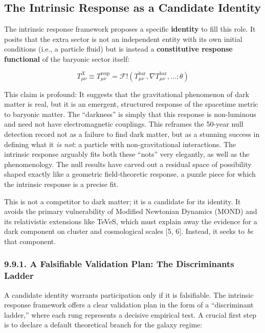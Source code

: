 \documentclass[11pt]{article}
\begin{document}
\subsection{The Intrinsic Response as a Candidate Identity}\label{the-intrinsic-response-as-a-candidate-identity}

The intrinsic response framework proposes a specific \textbf{identity} to fill this role. It posits that the extra sector is not an independent entity with its own initial conditions (i.e., a particle fluid) but is instead a \textbf{constitutive response functional} of the baryonic sector itself:

\[T_{\mu\nu}^{X} \equiv T_{\mu\nu}^{\text{resp}}\mathcal{= F}\text{!}\left( T_{\mu\nu}^{\text{bar}},\nabla T_{\mu\nu}^{\text{bar}},\ldots;\theta \right)\]

This claim is profound: It suggests that the gravitational phenomenon of dark matter is real, but it is an emergent, structured response of the spacetime metric to baryonic matter. The ``darkness'' is simply that this response is non-luminous and need not have electromagnetic couplings. This reframes the 50-year null detection record not as a failure to find dark matter, but as a stunning success in defining what it \emph{is not}: a particle with non-gravitational interactions. The intrinsic response arguably fits both these ``nots'' very elegantly, as well as the phenomenology. The null results have carved out a residual space of possibility shaped exactly like a geometric field-theoretic response, a puzzle piece for which the intrinsic response is a precise fit.

This is not a competitor to dark matter; it is a candidate for its identity. It avoids the primary vulnerability of Modified Newtonian Dynamics (MOND) and its relativistic extensions like TeVeS, which must explain away the evidence for a dark component on cluster and cosmological scales {[}5, 6{]}. Instead, it seeks to \emph{be} that component.

\subsubsection{9.9.1. A Falsifiable Validation Plan: The Discriminants Ladder}\label{a-falsifiable-validation-plan-the-discriminants-ladder}

A candidate identity warrants participation only if it is falsifiable. The intrinsic response framework offers a clear validation plan in the form of a ``discriminant ladder,'' where each rung represents a decisive empirical test. A crucial first step is to declare a default theoretical branch for the galaxy regime:
\end{document}
